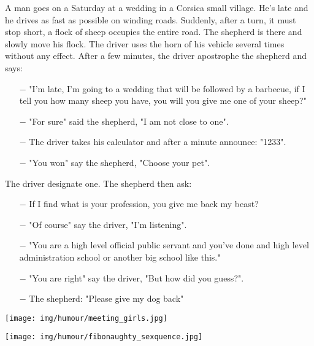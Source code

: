 A man goes on a Saturday at a wedding in a Corsica small village. He's late and he drives as fast as possible on winding roads. Suddenly, after a turn, it must stop short, a flock of sheep occupies the entire road. The shepherd is there and slowly move his flock. The driver uses the horn of his vehicle several times without any effect. After a few minutes, the driver apostrophe the shepherd and says:
\begin{itemize}
	\item[$-$] "I'm late, I'm going to a wedding that will be followed by a barbecue, if I tell you how many sheep you have, you will you give me one of your sheep?"

	\item[$-$] "For sure" said the shepherd, "I am not close to one". 

	\item[$-$] The driver takes his calculator and after a minute announce: "1233".

	\item[$-$] "You won" say the shepherd, "Choose your pet".
\end{itemize}
The driver designate one. The shepherd then ask:
\begin{itemize}
	\item[$-$] If I find what is your profession, you give me back my beast?

	\item[$-$] "Of course" say the driver, "I'm listening".

	\item[$-$] "You are a high level official public servant and you've done and high level administration school or another big school like this."

	\item[$-$] "You are right" say the driver, "But how did you guess?".

	\item[$-$] The shepherd: "Please give my dog back"
\end{itemize}
\begin{center}\underline{\hspace{5 cm}}\end{center}

	\begin{center}
	\texttt{[image: img/humour/meeting\_girls.jpg]}
	\end{center}

	\begin{center}
	\texttt{[image: img/humour/fibonaughty\_sexquence.jpg]}
	\end{center}

